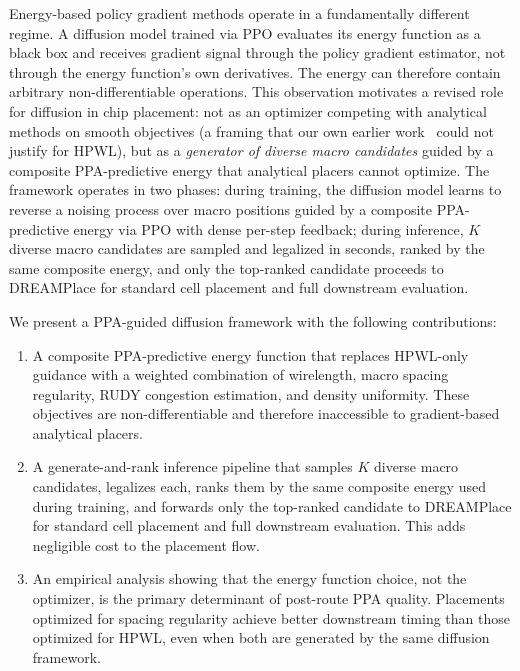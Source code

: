 \documentclass[sigconf,anonymous,review,9pt]{acmart}
\begin{document}
Energy-based policy gradient methods operate in a fundamentally different
regime. A diffusion model trained via PPO evaluates its energy function
as a black box and receives gradient signal through the policy gradient
estimator, not through the energy function's own derivatives. The energy
can therefore contain arbitrary non-differentiable operations. This
observation motivates a revised role for diffusion in chip placement:
not as an optimizer competing with analytical methods on smooth
objectives (a framing that our own earlier
work~\cite{chen2026dac} could not justify for HPWL), but as a
\emph{generator of diverse macro candidates} guided by a composite
PPA-predictive energy that analytical placers cannot optimize. The
framework operates in two phases: during training, the diffusion model
learns to reverse a noising process over macro positions guided by a
composite PPA-predictive energy via PPO with dense per-step feedback;
during inference, $K$ diverse macro candidates are sampled and legalized
in seconds, ranked by the same composite energy, and only the
top-ranked candidate proceeds to DREAMPlace for standard cell placement
and full downstream evaluation.

We present a PPA-guided diffusion framework with the following
contributions:

\begin{enumerate}
    \item A composite PPA-predictive energy function that replaces
    HPWL-only guidance with a weighted combination of wirelength, macro
    spacing regularity, RUDY congestion estimation, and density
    uniformity. These objectives are non-differentiable and therefore
    inaccessible to gradient-based analytical placers.

    \item A generate-and-rank inference pipeline that samples $K$
    diverse macro candidates, legalizes each, ranks them by the same
    composite energy used during training, and forwards only the
    top-ranked candidate to DREAMPlace for standard cell placement and
    full downstream evaluation. This adds negligible cost to the
    placement flow.

    \item An empirical analysis showing that the energy function
    choice, not the optimizer, is the primary determinant of post-route
    PPA quality. Placements optimized for spacing regularity achieve
    better downstream timing than those optimized for HPWL, even when
    both are generated by the same diffusion framework.
\end{enumerate}
\end{document}
